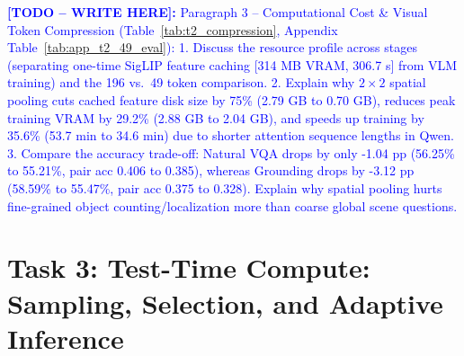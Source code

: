 \documentclass{article}
\newcommand{\writetodo}[1]{\noindent\textcolor{blue}{\textbf{[TODO -- WRITE HERE]:} #1}\par\medskip}
\begin{document}
\begin{table}[htbp]
    \centering
    \caption{Task 2 Stage-by-Stage Resource Profile and Visual Token Compression (196 vs.\ 49 Tokens). }
    \label{tab:t2_compression}
    \small
\end{table}

\writetodo{Paragraph 3 -- Computational Cost & Visual Token Compression (Table~\ref{tab:t2_compression}, Appendix Table~\ref{tab:app_t2_49_eval}):
1. Discuss the resource profile across stages (separating one-time SigLIP feature caching [314 MB VRAM, 306.7 s] from VLM training) and the 196 vs.\ 49 token comparison.
2. Explain why $2\times 2$ spatial pooling cuts cached feature disk size by 75\% (2.79 GB to 0.70 GB), reduces peak training VRAM by 29.2\% (2.88 GB to 2.04 GB), and speeds up training by 35.6\% (53.7 min to 34.6 min) due to shorter attention sequence lengths in Qwen.
3. Compare the accuracy trade-off: Natural VQA drops by only -1.04 pp (56.25\% to 55.21\%, pair acc 0.406 to 0.385), whereas Grounding drops by -3.12 pp (58.59\% to 55.47\%, pair acc 0.375 to 0.328). Explain why spatial pooling hurts fine-grained object counting/localization more than coarse global scene questions.}

\section{Task 3: Test-Time Compute: Sampling, Selection, and Adaptive Inference}
\label{sec:task3}
\end{document}

